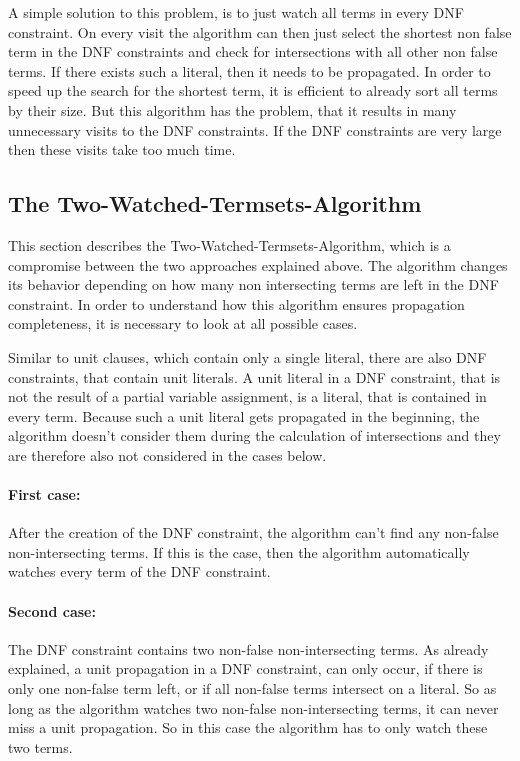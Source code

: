 A simple solution to this problem, is to just watch all terms in every DNF constraint.
On every visit the algorithm can then just select the shortest non false term in the DNF constraints and check for intersections with all other non false terms. If there exists such a literal, then it needs to be propagated. In order to speed up the search for the shortest term, it is efficient to already sort all terms by their size. But this algorithm has the problem, that it results in many unnecessary visits to the DNF constraints. If the DNF constraints are very large then these visits take too much time.

\subsection{The Two-Watched-Termsets-Algorithm}

This section describes the Two-Watched-Termsets-Algorithm, which is a compromise between the two approaches explained above. The algorithm changes its behavior depending on how many non intersecting terms are left in the DNF constraint. In order to understand how this algorithm ensures propagation completeness, it is necessary to look at all possible cases.

Similar to unit clauses, which contain only a single literal, there are also DNF constraints, that contain unit literals. A unit literal in a DNF constraint, that is not the result of a partial variable assignment, is a literal, that is contained in every term.
Because such a unit literal gets propagated in the beginning, the algorithm doesn't consider them during the calculation of intersections and they are therefore also not considered in the cases below.


\paragraph{First case:} After the creation of the DNF constraint, the algorithm can't find any non-false non-intersecting terms. If this is the case, then the algorithm automatically watches every term of the DNF constraint.

\paragraph{Second case:} The DNF constraint contains two non-false non-intersecting terms. As already explained, a unit propagation in a DNF constraint, can only occur, if there is only one non-false term left, or if all non-false terms intersect on a literal. So as long as the algorithm watches two non-false non-intersecting terms, it can never miss a unit propagation. So in this case the algorithm has to only watch these two terms.

